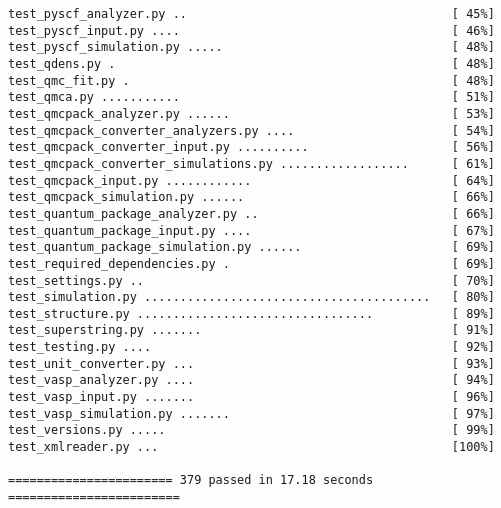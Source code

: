 \documentclass[oneside,11pt]{memoir}
\numberwithin{equation}{section}
\begin{document}
\begin{shaded}
\begin{verbatim}
test_pyscf_analyzer.py ..                                     [ 45%]
test_pyscf_input.py ....                                      [ 46%]
test_pyscf_simulation.py .....                                [ 48%]
test_qdens.py .                                               [ 48%]
test_qmc_fit.py .                                             [ 48%]
test_qmca.py ...........                                      [ 51%]
test_qmcpack_analyzer.py ......                               [ 53%]
test_qmcpack_converter_analyzers.py ....                      [ 54%]
test_qmcpack_converter_input.py ..........                    [ 56%]
test_qmcpack_converter_simulations.py ..................      [ 61%]
test_qmcpack_input.py ............                            [ 64%]
test_qmcpack_simulation.py ......                             [ 66%]
test_quantum_package_analyzer.py ..                           [ 66%]
test_quantum_package_input.py ....                            [ 67%]
test_quantum_package_simulation.py ......                     [ 69%]
test_required_dependencies.py .                               [ 69%]
test_settings.py ..                                           [ 70%]
test_simulation.py ........................................   [ 80%]
test_structure.py .................................           [ 89%]
test_superstring.py .......                                   [ 91%]
test_testing.py ....                                          [ 92%]
test_unit_converter.py ...                                    [ 93%]
test_vasp_analyzer.py ....                                    [ 94%]
test_vasp_input.py .......                                    [ 96%]
test_vasp_simulation.py .......                               [ 97%]
test_versions.py .....                                        [ 99%]
test_xmlreader.py ...                                         [100%]

======================= 379 passed in 17.18 seconds ========================
\end{verbatim}
\end{shaded}
\end{document}
